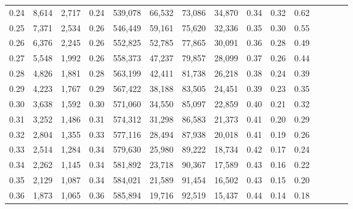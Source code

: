 \begin{tabular}{rrrcrrrrrrrrrrr}
0.24 &   8,614 &  2,717 &                                       0.24 &  539,078 &   66,532 &   73,086 &   34,870 &  0.34 &  0.32 &                         0.62 \\
0.25 &   7,371 &  2,534 &                                       0.26 &  546,449 &   59,161 &   75,620 &   32,336 &  0.35 &  0.30 &                         0.55 \\
0.26 &   6,376 &  2,245 &                                       0.26 &  552,825 &   52,785 &   77,865 &   30,091 &  0.36 &  0.28 &                         0.49 \\
0.27 &   5,548 &  1,992 &                                       0.26 &  558,373 &   47,237 &   79,857 &   28,099 &  0.37 &  0.26 &                         0.44 \\
0.28 &   4,826 &  1,881 &                                       0.28 &  563,199 &   42,411 &   81,738 &   26,218 &  0.38 &  0.24 &                         0.39 \\
0.29 &   4,223 &  1,767 &                                       0.29 &  567,422 &   38,188 &   83,505 &   24,451 &  0.39 &  0.23 &                         0.35 \\
0.30 &   3,638 &  1,592 &                                       0.30 &  571,060 &   34,550 &   85,097 &   22,859 &  0.40 &  0.21 &                         0.32 \\
0.31 &   3,252 &  1,486 &                                       0.31 &  574,312 &   31,298 &   86,583 &   21,373 &  0.41 &  0.20 &                         0.29 \\
0.32 &   2,804 &  1,355 &                                       0.33 &  577,116 &   28,494 &   87,938 &   20,018 &  0.41 &  0.19 &                         0.26 \\
0.33 &   2,514 &  1,284 &                                       0.34 &  579,630 &   25,980 &   89,222 &   18,734 &  0.42 &  0.17 &                         0.24 \\
0.34 &   2,262 &  1,145 &                                       0.34 &  581,892 &   23,718 &   90,367 &   17,589 &  0.43 &  0.16 &                         0.22 \\
0.35 &   2,129 &  1,087 &                                       0.34 &  584,021 &   21,589 &   91,454 &   16,502 &  0.43 &  0.15 &                         0.20 \\
0.36 &   1,873 &  1,065 &                                       0.36 &  585,894 &   19,716 &   92,519 &   15,437 &  0.44 &  0.14 &                         0.18 \\

\end{tabular}
